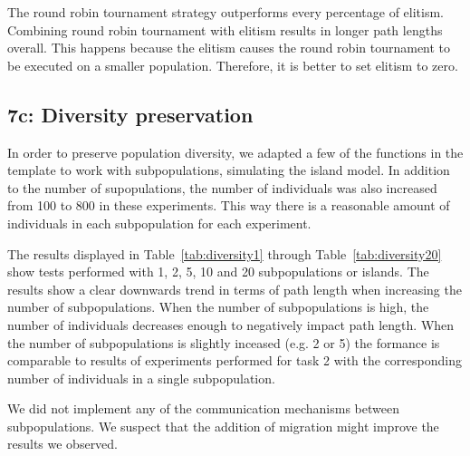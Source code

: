 \documentclass{report}
\begin{document}
The round robin tournament strategy outperforms every percentage of elitism. Combining round robin tournament with elitism results in longer path lengths overall. This happens because the elitism causes the round robin tournament to be executed on a smaller population. Therefore, it is better to set elitism to zero.


\subsection{7c: Diversity preservation}
In order to preserve population diversity, we adapted a few of the functions in the template to work with subpopulations, simulating the island model. In addition to the number of supopulations, the number of individuals was also increased from 100 to 800 in these experiments. This way there is a reasonable amount of individuals in each subpopulation for each experiment. 

The results displayed in Table~\ref{tab:diversity1} through Table~\ref{tab:diversity20} show tests performed with 1, 2, 5, 10 and 20 subpopulations or islands. The results show a clear downwards trend in terms of path length when increasing the number of subpopulations. When the number of subpopulations is high, the number of individuals decreases enough to negatively impact path length. When the number of subpopulations is slightly inceased (e.g. 2 or 5) the formance is comparable to results of experiments performed for task 2 with the corresponding number of individuals in a single subpopulation.


We did not implement any of the communication mechanisms between subpopulations. We suspect that the addition of migration might improve the results we observed.
\end{document}
